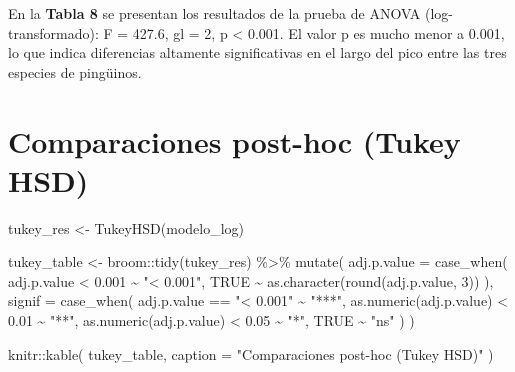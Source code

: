 \documentclass[
  spanish,
  11pt,
  a4paper,
  DIV=11,
  numbers=noendperiod]{scrartcl}
\newenvironment{Shaded}{\begin{snugshade}}{\end{snugshade}}
\newcommand{\AttributeTok}[1]{\textcolor[rgb]{0.40,0.45,0.13}{#1}}
\newcommand{\ConstantTok}[1]{\textcolor[rgb]{0.56,0.35,0.01}{#1}}
\newcommand{\DecValTok}[1]{\textcolor[rgb]{0.68,0.00,0.00}{#1}}
\newcommand{\FloatTok}[1]{\textcolor[rgb]{0.68,0.00,0.00}{#1}}
\newcommand{\FunctionTok}[1]{\textcolor[rgb]{0.28,0.35,0.67}{#1}}
\newcommand{\NormalTok}[1]{\textcolor[rgb]{0.00,0.23,0.31}{#1}}
\newcommand{\OtherTok}[1]{\textcolor[rgb]{0.00,0.23,0.31}{#1}}
\newcommand{\SpecialCharTok}[1]{\textcolor[rgb]{0.37,0.37,0.37}{#1}}
\newcommand{\StringTok}[1]{\textcolor[rgb]{0.13,0.47,0.30}{#1}}
\begin{document}
En la \textbf{Tabla 8} se presentan los resultados de la prueba de ANOVA
(log-transformado): F = 427.6, gl = 2, p \textless{} 0.001. El valor p
es mucho menor a 0.001, lo que indica diferencias altamente
significativas en el largo del pico entre las tres especies de
pingüinos.

\section{Comparaciones post-hoc (Tukey
HSD)}\label{comparaciones-post-hoc-tukey-hsd}

\begin{Shaded}
\begin{Highlighting}[numbers=left,,]
\NormalTok{tukey\_res }\OtherTok{\textless{}{-}} \FunctionTok{TukeyHSD}\NormalTok{(modelo\_log)}

\NormalTok{tukey\_table }\OtherTok{\textless{}{-}}\NormalTok{ broom}\SpecialCharTok{::}\FunctionTok{tidy}\NormalTok{(tukey\_res) }\SpecialCharTok{\%\textgreater{}\%}
  \FunctionTok{mutate}\NormalTok{(}
    \AttributeTok{adj.p.value =} \FunctionTok{case\_when}\NormalTok{(}
\NormalTok{      adj.p.value }\SpecialCharTok{\textless{}} \FloatTok{0.001} \SpecialCharTok{\textasciitilde{}} \StringTok{"\textless{} 0.001"}\NormalTok{,}
      \ConstantTok{TRUE} \SpecialCharTok{\textasciitilde{}} \FunctionTok{as.character}\NormalTok{(}\FunctionTok{round}\NormalTok{(adj.p.value, }\DecValTok{3}\NormalTok{))}
\NormalTok{    ),}
    \AttributeTok{signif =} \FunctionTok{case\_when}\NormalTok{(}
\NormalTok{      adj.p.value }\SpecialCharTok{==} \StringTok{"\textless{} 0.001"} \SpecialCharTok{\textasciitilde{}} \StringTok{"***"}\NormalTok{,}
      \FunctionTok{as.numeric}\NormalTok{(adj.p.value) }\SpecialCharTok{\textless{}} \FloatTok{0.01}  \SpecialCharTok{\textasciitilde{}} \StringTok{"**"}\NormalTok{,}
      \FunctionTok{as.numeric}\NormalTok{(adj.p.value) }\SpecialCharTok{\textless{}} \FloatTok{0.05}  \SpecialCharTok{\textasciitilde{}} \StringTok{"*"}\NormalTok{,}
      \ConstantTok{TRUE} \SpecialCharTok{\textasciitilde{}} \StringTok{"ns"}
\NormalTok{    )}
\NormalTok{  )}

\NormalTok{knitr}\SpecialCharTok{::}\FunctionTok{kable}\NormalTok{(}
\NormalTok{  tukey\_table,}
  \AttributeTok{caption =} \StringTok{"Comparaciones post{-}hoc (Tukey HSD)"}
\NormalTok{)}
\end{Highlighting}
\end{Shaded}
\end{document}
